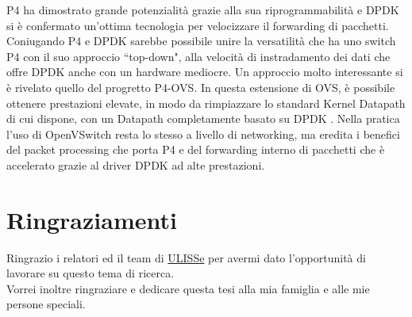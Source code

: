 \newline
P4 ha dimostrato grande potenzialità grazie alla sua riprogrammabilità e DPDK si è confermato un'ottima tecnologia per velocizzare il forwarding di pacchetti. 
Coniugando P4 e DPDK sarebbe possibile unire la versatilità che ha uno switch P4 con il suo approccio ``top-down", alla velocità di instradamento dei dati che offre DPDK anche con un hardware mediocre. Un approccio molto interessante si è rivelato quello del progretto P4-OVS. In questa estensione di OVS, è possibile ottenere prestazioni elevate, in modo da rimpiazzare lo standard Kernel Datapath di cui dispone, con un Datapath completamente basato su DPDK \cite{noauthor_p4ovs}. Nella pratica l'uso di OpenVSwitch resta lo stesso a livello di networking, ma eredita i benefici del packet processing che porta P4 e del forwarding interno di pacchetti che è accelerato grazie al driver DPDK ad alte prestazioni. 

\chapter*{Ringraziamenti}
Ringrazio i relatori ed il team di \href{https://ulisse.unibo.it/}{ULISSe} per avermi dato l'opportunità di lavorare su questo tema di ricerca.\\
\newline
Vorrei inoltre ringraziare e dedicare questa tesi alla mia famiglia e alle mie persone speciali.

\newpage
\myemptypage

\printbibliography
\listoffigures
